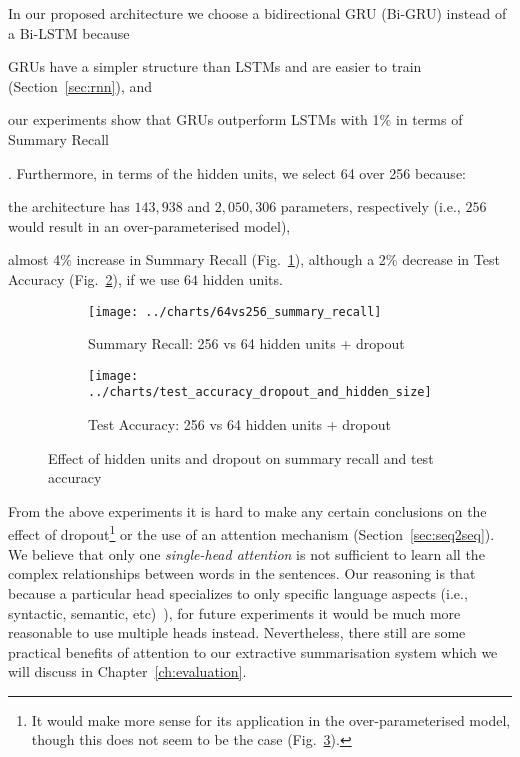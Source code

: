 In our proposed architecture we choose a bidirectional GRU (Bi-GRU) instead of a Bi-LSTM because
\begin{enumerate*}[label=(\alph*)]
    \item GRUs have a simpler structure than LSTMs and are easier to train (Section~\ref{sec:rnn}), and
    \item our experiments show that GRUs outperform LSTMs with 1\% in terms of Summary Recall
\end{enumerate*}.
Furthermore, in terms of the hidden units, we select 64 over 256 because:
\begin{enumerate*}[label=(\alph*)]
    \item the architecture has $143,938$ and $2,050,306$ parameters, respectively (i.e., $256$ would result in an over-parameterised model),
    \item almost 4\% increase in Summary Recall (Fig.~\ref{fig:64vs256_summary_recall}),
    although a 2\% decrease in Test Accuracy (Fig.~\ref{fig:test_accuracy_dropout_and_hidden_size}), if we use $64$ hidden units.
\end{enumerate*}
\begin{figure}[ht]
    \begin{subfigure}{0.49\textwidth}
        \centering \texttt{[image: ../charts/64vs256\_summary\_recall]}
        \caption{Summary Recall: 256 vs 64 hidden units + dropout}
        \label{fig:64vs256_summary_recall}
    \end{subfigure}%
    \hfill
    \begin{subfigure}{0.49\textwidth}
        \centering
        \texttt{[image: ../charts/test\_accuracy\_dropout\_and\_hidden\_size]}
        \caption{Test Accuracy: 256 vs 64 hidden units + dropout}
        \label{fig:test_accuracy_dropout_and_hidden_size}
    \end{subfigure}
    \caption{Effect of hidden units and dropout on summary recall and test accuracy}
    \label{fig:dropout_and_hidden_size}
\end{figure}

From the above experiments it is hard to make any certain conclusions on the effect of dropout\footnote{
    It would make more sense for its application in the over-parameterised model, though this does not seem to be the case (Fig.~\ref{fig:dropout_and_hidden_size}).
} or the use of an attention mechanism (Section~\ref{sec:seq2seq}).
We believe that only one \emph{single-head attention} is not sufficient to learn all the complex relationships between words in the sentences.
Our reasoning is that because a particular head specializes to only specific language aspects (i.e., syntactic, semantic, etc)~\cite{clark-etal-2019-bert}),
for future experiments it would be much more reasonable to use multiple heads instead.
Nevertheless, there still are some practical benefits of attention to our extractive summarisation system which we will discuss in Chapter~\ref{ch:evaluation}.

